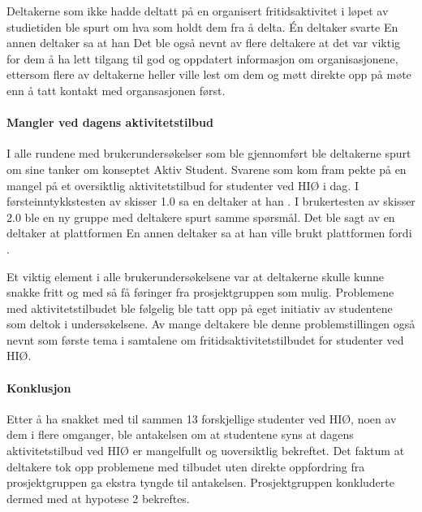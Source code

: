 Deltakerne som ikke hadde deltatt på en organisert fritidsaktivitet i løpet av studietiden ble spurt om hva som holdt dem fra å delta. Én deltaker svarte  En annen deltaker sa at han  Det ble også nevnt av flere deltakere at det var viktig for dem å ha lett tilgang til god og oppdatert informasjon om organisasjonene, ettersom flere av deltakerne heller ville lest om dem og møtt direkte opp på møte enn å tatt kontakt med organsasjonen først.

\paragraph{Mangler ved dagens aktivitetstilbud}
I alle rundene med brukerundersøkelser som ble gjennomført ble deltakerne spurt om sine tanker om konseptet Aktiv Student. Svarene som kom fram pekte på en mangel på et oversiktlig aktivitetstilbud for studenter ved HIØ i dag. I førsteinntykkstesten av skisser 1.0 sa en deltaker at han . I brukertesten av skisser 2.0 ble en ny gruppe med deltakere spurt samme spørsmål. Det ble sagt av en deltaker at plattformen  En annen deltaker sa at han ville brukt plattformen fordi .

Et viktig element i alle brukerundersøkelsene var at deltakerne skulle kunne snakke fritt og med så få føringer fra prosjektgruppen som mulig. Problemene med aktivitetstilbudet ble følgelig ble tatt opp på eget initiativ av studentene som deltok i undersøkelsene. Av mange deltakere ble denne problemstillingen også nevnt som første tema i samtalene om fritidsaktivitetstilbudet for studenter ved HIØ.

\paragraph{Konklusjon}
Etter å ha snakket med til sammen 13 forskjellige studenter ved HIØ, noen av dem i flere omganger, ble antakelsen om at studentene syns at dagens aktivitetstilbud ved HIØ er mangelfullt og uoversiktlig bekreftet. Det faktum at deltakere tok opp problemene med tilbudet uten direkte oppfordring fra prosjektgruppen ga ekstra tyngde til antakelsen. Prosjektgruppen konkluderte dermed med at hypotese 2 bekreftes.

